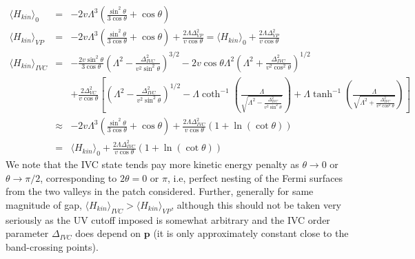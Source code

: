 \documentclass[aps,pra,twocolumn,superscriptaddress,10pt,article,nofootinbib,showpacs,longbibliography]{revtex4-1}
\def \p{{\mathbf p}}
\def \beq{\begin{eqnarray}}
\def \eeq{\end{eqnarray}}
\def \nn{\nonumber \\}
\begin{document}
\beq
\langle H_{kin} \rangle_0 &=& - 2 v \Lambda^3 \left( \frac{\sin^2\theta}{3\cos\theta} + \cos\theta \right) \nn
\langle H_{kin} \rangle_{VP} & = & - 2 v \Lambda^3 \left( \frac{\sin^2\theta}{3\cos\theta} + \cos\theta \right) + \frac{2 \Lambda \Delta^2_{VP}}{v \cos\theta} =  \langle H_{kin} \rangle_0 + \frac{2 \Lambda \Delta^2_{VP}}{v \cos\theta}  \nn
\langle H_{kin} \rangle_{IVC} & =&  -   \frac{2 v \sin^2\theta}{3\cos\theta} \left( \Lambda^2 - \frac{\Delta^2_{IVC}}{v^2 \sin^2 \theta} \right)^{3/2} - 2 v \cos\theta \Lambda^2 \left( \Lambda^2 + \frac{\Delta^2_{IVC}}{v^2 \cos^2 \theta}  \right)^{1/2} \nn
&& +  \frac{2 \Delta_{VC}^2}{v \cos\theta} \left[ \left( \Lambda^2 - \frac{\Delta^2_{IVC}}{v^2 \sin^2 \theta}  \right)^{1/2} -  \Lambda \coth^{-1}\left( \frac{\Lambda}{\sqrt{\Lambda^2 - \frac{\Delta^2_{IVC}}{v^2 \sin^2 \theta} }} \right) + \Lambda \tanh^{-1} \left( \frac{\Lambda}{\sqrt{ \Lambda^2 + \frac{\Delta^2_{IVC}}{v^2 \cos^2 \theta}} } \right) \right] \nn
& \approx & - 2 v \Lambda^3 \left( \frac{\sin^2\theta}{3\cos\theta} + \cos\theta \right) + \frac{2 \Lambda \Delta_{IVC}^2}{v \cos\theta} \left(1 + \ln(\cot\theta) \right) \nn
& = &  \langle H_{kin} \rangle_0  +  \frac{2 \Lambda \Delta_{IVC}^2}{v \cos\theta} \left(1 + \ln(\cot\theta) \right) 
\label{eq:Hkin}
\eeq
We note that the IVC state tends pay more kinetic energy penalty as $\theta \to 0$ or $\theta \to \pi/2$, corresponding to $2\theta = 0$ or $\pi$, i.e, perfect nesting of the Fermi surfaces from the two valleys in the patch considered. 
Further, generally for same magnitude of gap, $\langle H_{kin} \rangle_{IVC}  > \langle H_{kin} \rangle_{VP}$, although this should not be taken very seriously as the UV cutoff imposed is somewhat arbitrary and the IVC order parameter $\Delta_{IVC}$ does depend on $\p$ (it is only approximately constant close to the band-crossing points). 
\end{document}
